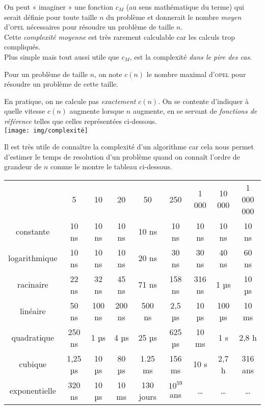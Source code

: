 On peut « imaginer » une fonction $c_M$ (au sens mathématique du terme) qui serait définie pour toute taille $n$ du problème et	donnerait le nombre \textit{moyen}  d'\textsc{opel} nécessaires pour résoudre un problème de taille $n$.\\
Cette \textit{complexité moyenne} est très rarement calculable car les calculs trop compliqués.\\


Plus simple mais tout aussi utile que $c_M$, est la complexité \textit{dans le pire des cas}.

\begin{definition}
Pour un problème de taille $n$, on note $c(n)$ le nombre maximal d'\textsc{opel} pour résoudre un problème de cette taille.
\end{definition}

En pratique, on ne calcule pas \textit{exactement} $c(n)$. On se contente d'indiquer à quelle vitesse $c(n)$ augmente lorsque $n$ augmente, en se servant de \textit{fonctions de référence} telles que celles représentées ci-dessous.\\

\texttt{[image: img/complexité]}

Il est très utile de connaître la complexité d'un algorithme car cela nous permet d'estimer le temps de resolution d'un problème quand on connaît l'ordre de grandeur de $n$ comme le montre le tableau ci-dessous.
\begin{center}
\scriptsize\alternaterowcolors%
\renewcommand{\arraystretch}{1.5}
\begin{tabular}{ccccccccc}

\rowcolor{UGLiOrange}
& {\boxfont\color{white}5} & {\boxfont\color{white}10} & {\boxfont\color{white}20} & {\boxfont\color{white}50} & {\boxfont\color{white}250} & {\boxfont\color{white}1 000} & {\boxfont\color{white}10 000} & {\boxfont\color{white}1 000 000} \\
constante & 10 ns & 10 ns & 10 ns & 10 ns & 10 ns & 10 ns & 10 ns & 10 ns \\
logarithmique & 10 ns & 10 ns & 10 ns & 20 ns  & 30 ns & 30 ns & 40 ns & 60 ns \\
racinaire & 22 ns & 32 ns & 45 ns & 71 ns & 158 ns & 316 ns & 1 µs & 10 µs \\
linéaire & 50 ns & 100 ns & 200 ns & 500 ns & 2,5 µs & 10 µs & 100 µs & 10 ms \\
quadratique & 250 ns & 1 µs & 4 µs & 25 µs & 625 µs & 10 ms & 1 s & 2,8 h \\
cubique & 1,25 µs & 10 µs & 80 µs & 1.25 ms & 156 ms & 10 s & 2,7 h & 316 ans \\
exponentielle & 320 ns & 10 µs & 10 ms & 130 jours & $10^{59}$ ans & \ldots & \ldots & \ldots \\
\end{tabular}
\renewcommand{\arraystretch}{1}
\end{center}


